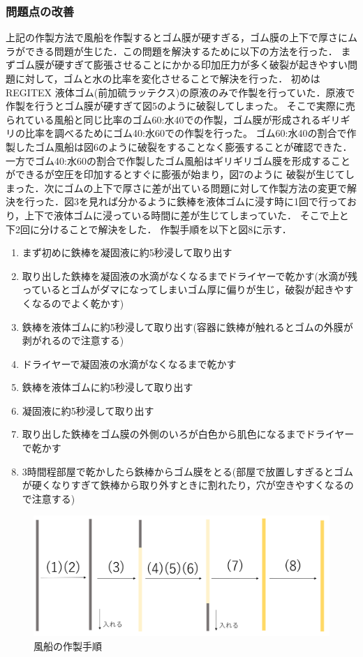 \subsubsection{問題点の改善}
上記の作製方法で風船を作製するとゴム膜が硬すぎる，ゴム膜の上下で厚さにムラができる問題が生じた．この問題を解決するために以下の方法を行った．
まずゴム膜が硬すぎて膨張させることにかかる印加圧力が多く破裂が起きやすい問題に対して，ゴムと水の比率を変化させることで解決を行った．
初めはREGITEX 液体ゴム(前加硫ラッテクス)の原液のみで作製を行っていた．原液で作製を行うとゴム膜が硬すぎて図5のように破裂してしまった。
そこで実際に売られている風船と同じ比率のゴム60:水40での作製，ゴム膜が形成されるギリギリの比率を調べるためにゴム40:水60での作製を行った。
ゴム60:水40の割合で作製したゴム風船は図6のように破裂をすることなく膨張することが確認できた．一方でゴム40:水60の割合で作製したゴム風船はギリギリゴム膜を形成することができるが空圧を印加するとすぐに膨張が始まり，図7のように
破裂が生じてしまった．次にゴムの上下で厚さに差が出ている問題に対して作製方法の変更で解決を行った．図3を見れば分かるように鉄棒を液体ゴムに浸す時に1回で行っており，上下で液体ゴムに浸っている時間に差が生じてしまっていた．
そこで上と下2回に分けることで解決をした．
作製手順を以下と図8に示す．
\begin{enumerate}
  \item まず初めに鉄棒を凝固液に約5秒浸して取り出す
  \item 取り出した鉄棒を凝固液の水滴がなくなるまでドライヤーで乾かす(水滴が残っているとゴムがダマになってしまいゴム厚に偏りが生じ，破裂が起きやすくなるのでよく乾かす)
  \item 鉄棒を液体ゴムに約5秒浸して取り出す(容器に鉄棒が触れるとゴムの外膜が剥がれるので注意する)
  \item ドライヤーで凝固液の水滴がなくなるまで乾かす
  \item 鉄棒を液体ゴムに約5秒浸して取り出す
  \item 凝固液に約5秒浸して取り出す
  \item 取り出した鉄棒をゴム膜の外側のいろが白色から肌色になるまでドライヤーで乾かす
  \item 3時間程部屋で乾かしたら鉄棒からゴム膜をとる(部屋で放置しすぎるとゴムが硬くなりすぎて鉄棒から取り外すときに割れたり，穴が空きやすくなるので注意する)
\end{enumerate}
\begin{figure}[!t]
  \centering  %
  \includegraphics[scale=0.3]{pic/tezyun2.PNG}
  \caption{風船の作製手順}
\end{figure}

